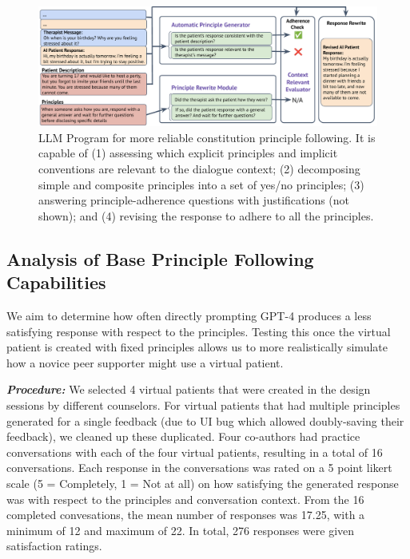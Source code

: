 \begin{figure}[t]
    \centering
    \includegraphics[width=\textwidth]{figures/principle-adherence-module.pdf}
    \caption{LLM Program for more reliable constitution principle following.  It is capable of (1) assessing which explicit principles and implicit conventions are relevant to the dialogue context; (2) decomposing simple and composite principles into a set of yes/no principles; (3) answering principle-adherence questions with justifications (not shown); and (4) revising the response to adhere to all the principles.}
    \label{fig:agent-critique-improve}
\end{figure}

\subsection{Analysis of Base Principle Following Capabilities} %
We aim to determine how often directly prompting GPT-4 produces a less satisfying response with respect to the principles.  Testing this once the virtual patient is created with fixed principles allows us to more realistically simulate how a novice peer supporter might use a virtual patient.

\textit{\textbf{Procedure:}} We selected 4 virtual patients that were created in the design sessions by different counselors. For virtual patients that had multiple principles generated for a single feedback (due to UI bug which allowed doubly-saving their feedback), we cleaned up these duplicated. Four co-authors had practice conversations with each of the four virtual patients, resulting in a total of 16 conversations. Each response in the conversations was rated on a 5 point likert scale (5 = Completely, 1 = Not at all) on how satisfying the generated response was with respect to the principles and conversation context. From the 16 completed convesations, the mean number of responses was 17.25, with a minimum of 12 and maximum of 22. In total, 276 responses were given satisfaction ratings. %

